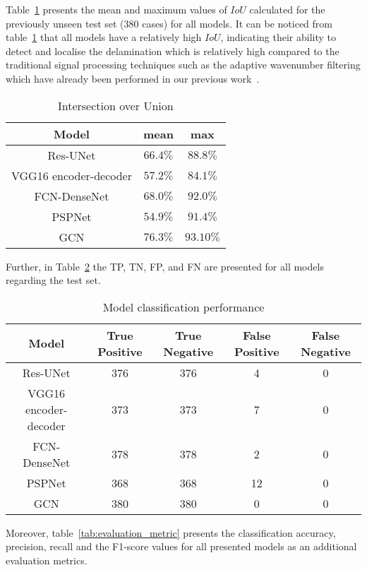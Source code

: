 Table~\ref{tab:table_iou} presents the mean and maximum values of \(IoU\) calculated for the previously unseen test set (380 cases) for all models.
It can be noticed from table~\ref{tab:table_iou}  that all models have a relatively high \(IoU\), indicating their ability to detect and localise the delamination which is relatively high compared to the traditional signal processing techniques such as the adaptive wavenumber filtering which have already been performed in our previous work~\cite{Ijjeh2021}.
\begin{table}[]
	\centering
	\caption{Intersection over Union}
	\label{tab:table_iou}
	\begin{tabular}{ccc}\hline
		Model & mean & max \\ \hline
		Res-UNet & \(66.4\%\) & \(88.8\%\) \\ 
		VGG16 encoder-decoder & \(57.2\%\) & \(84.1\%\) \\ 
		FCN-DenseNet & \(68.0\%\) & \(92.0\%\) \\ 
		PSPNet & \(54.9\%\) & \(91.4\%\) \\ 
		GCN & \(76.3\%\) & \(93.10\%\) \\ \hline
	\end{tabular}
\end{table}
Further, in Table~\ref{tab:table_performance} the TP, TN, FP, and FN are presented for all models regarding the test set. 
\begin{table}[]
	\centering
	\caption{Model classification performance}
	\label{tab:table_performance}
	\resizebox{\textwidth}{!}
	{
		\begin{tabular}{ccccc} \hline
			Model& True Positive & True Negative & False Positive & False Negative \\ \hline
			Res-UNet & 376 & 376 & 4 & 0 \\ 
			VGG16 encoder-decoder & 373 & 373 & 7 & 0 \\ 
			FCN-DenseNet & 378 & 378 & 2 & 0 \\ 
			PSPNet & 368 & 368 & 12 & 0 \\ 
			GCN & 380 & 380 & 0 & 0 \\ \hline
		\end{tabular}
	}
\end{table}
Moreover, table~\ref{tab:evaluation_metric} presents the classification accuracy, precision, recall and the F1-score values for all presented models as an additional evaluation metrics.
